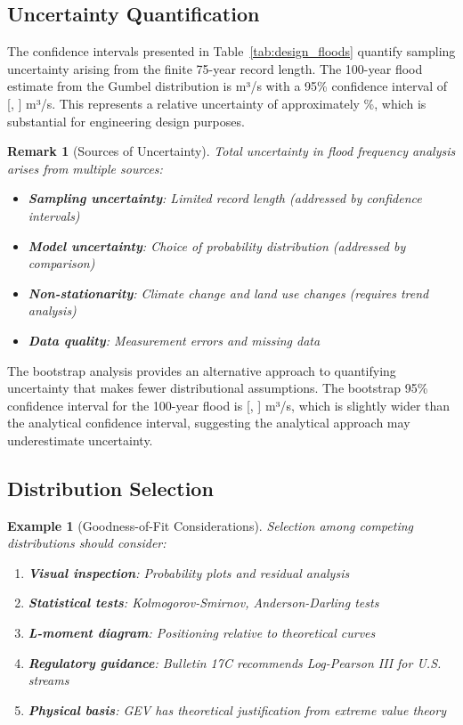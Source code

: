 \documentclass[a4paper, 11pt]{article}
\newtheorem{example}{Example}[section]
\newtheorem{remark}{Remark}[section]
\begin{document}
\subsection{Uncertainty Quantification}

The confidence intervals presented in Table~\ref{tab:design_floods} quantify sampling
uncertainty arising from the finite 75-year record length. The 100-year flood estimate
from the Gumbel distribution is  m³/s with a 95\% confidence
interval of [, ] m³/s. This represents
a relative uncertainty of approximately \%,
which is substantial for engineering design purposes.

\begin{remark}[Sources of Uncertainty]
Total uncertainty in flood frequency analysis arises from multiple sources:
\begin{itemize}
\item \textbf{Sampling uncertainty}: Limited record length (addressed by confidence intervals)
\item \textbf{Model uncertainty}: Choice of probability distribution (addressed by comparison)
\item \textbf{Non-stationarity}: Climate change and land use changes (requires trend analysis)
\item \textbf{Data quality}: Measurement errors and missing data
\end{itemize}
\end{remark}

The bootstrap analysis provides an alternative approach to quantifying uncertainty that makes
fewer distributional assumptions. The bootstrap 95\% confidence interval for the 100-year flood
is [, ] m³/s, which is
slightly wider than the analytical confidence interval, suggesting the analytical approach may
underestimate uncertainty.

\subsection{Distribution Selection}

\begin{example}[Goodness-of-Fit Considerations]
Selection among competing distributions should consider:
\begin{enumerate}
\item \textbf{Visual inspection}: Probability plots and residual analysis
\item \textbf{Statistical tests}: Kolmogorov-Smirnov, Anderson-Darling tests
\item \textbf{L-moment diagram}: Positioning relative to theoretical curves
\item \textbf{Regulatory guidance}: Bulletin 17C recommends Log-Pearson III for U.S. streams
\item \textbf{Physical basis}: GEV has theoretical justification from extreme value theory
\end{enumerate}
\end{example}
\end{document}
